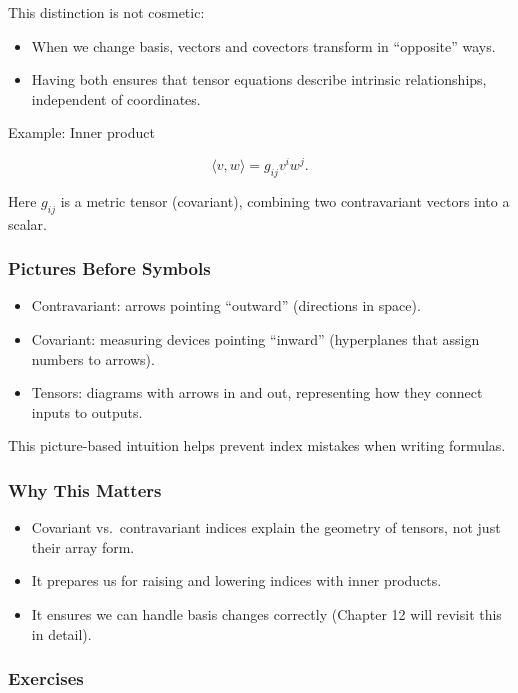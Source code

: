 \documentclass[
  letterpaper,
  DIV=11,
  numbers=noendperiod]{scrreprt}
\providecommand{\tightlist}{%
  \setlength{\itemsep}{0pt}\setlength{\parskip}{0pt}}
\begin{document}
This distinction is not cosmetic:

\begin{itemize}
\tightlist
\item
  When we change basis, vectors and covectors transform in ``opposite''
  ways.
\item
  Having both ensures that tensor equations describe intrinsic
  relationships, independent of coordinates.
\end{itemize}

Example: Inner product

\[
\langle v, w \rangle = g_{ij} v^i w^j.
\]

Here \(g_{ij}\) is a metric tensor (covariant), combining two
contravariant vectors into a scalar.

\subsubsection{Pictures Before Symbols}\label{pictures-before-symbols}

\begin{itemize}
\tightlist
\item
  Contravariant: arrows pointing ``outward'' (directions in space).
\item
  Covariant: measuring devices pointing ``inward'' (hyperplanes that
  assign numbers to arrows).
\item
  Tensors: diagrams with arrows in and out, representing how they
  connect inputs to outputs.
\end{itemize}

This picture-based intuition helps prevent index mistakes when writing
formulas.

\subsubsection{Why This Matters}\label{why-this-matters-1}

\begin{itemize}
\tightlist
\item
  Covariant vs.~contravariant indices explain the geometry of tensors,
  not just their array form.
\item
  It prepares us for raising and lowering indices with inner products.
\item
  It ensures we can handle basis changes correctly (Chapter 12 will
  revisit this in detail).
\end{itemize}

\subsubsection{Exercises}\label{exercises-9}
\end{document}
